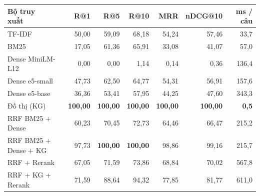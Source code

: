 \begin{tabular}{lrrrrrr}
\toprule
\makecell[l]{Bộ truy\\xuất} & R@1 & R@5 & R@10 & MRR & nDCG@10 & ms / câu \\
\midrule
TF-IDF & 50{,}00 & 59{,}09 & 68{,}18 & 54{,}24 & 57{,}46 & 33{,}7 \\
BM25 & 17{,}05 & 61{,}36 & 65{,}91 & 33{,}08 & 41{,}07 & 57{,}0 \\
Dense MiniLM-L12 & 0{,}00 & 0{,}00 & 1{,}14 & 0{,}14 & 0{,}36 & 136{,}4 \\
Dense e5-small & 47{,}73 & 62{,}50 & 64{,}77 & 54{,}31 & 56{,}91 & 157{,}6 \\
Dense e5-base & 36{,}36 & 53{,}41 & 57{,}95 & 44{,}25 & 47{,}60 & 343{,}3 \\
Đồ thị (KG) & \textbf{100{,}00} & \textbf{100{,}00} & \textbf{100{,}00} & \textbf{100{,}00} & \textbf{100{,}00} & \textbf{0{,}5} \\
RRF BM25 + Dense & 60{,}23 & 70{,}45 & 72{,}73 & 64{,}46 & 66{,}47 & 215{,}2 \\
RRF BM25 + Dense + KG & 97{,}73 & \textbf{100{,}00} & \textbf{100{,}00} & 98{,}86 & 99{,}16 & 215{,}7 \\
RRF + Rerank & 67{,}05 & 71{,}59 & 73{,}86 & 68{,}84 & 70{,}02 & 567{,}8 \\
RRF + KG + Rerank & 71{,}59 & 88{,}64 & 94{,}32 & 77{,}85 & 81{,}77 & 611{,}0 \\
\bottomrule
\end{tabular}
